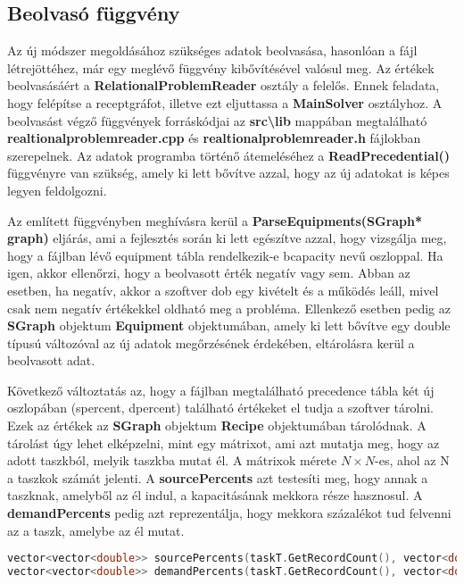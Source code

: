 \subsection{Beolvasó függvény}
Az új módszer megoldásához szükséges adatok beolvasása, hasonlóan a fájl létrejöttéhez, már egy meglévő függvény kibővítésével valósul meg.
Az értékek beolvasásáért a \textbf{RelationalProblemReader} osztály a felelős.
Ennek feladata, hogy felépítse a receptgráfot, illetve ezt eljuttassa a \textbf{MainSolver} osztályhoz.
A beolvasást végző függvények forráskódjai az \textbf{src\textbackslash lib} mappában megtalálható \textbf{realtionalproblemreader.cpp} és \textbf{realtionalproblemreader.h} fájlokban szerepelnek.
Az adatok programba történő átemeléséhez a \textbf{ReadPrecedential()} függvényre van szükség, amely ki lett bővítve azzal, hogy az új adatokat is képes legyen feldolgozni. 

Az említett függvényben meghívásra kerül a \textbf{ParseEquipments(SGraph* graph)} eljárás, ami a fejlesztés során ki lett egészítve azzal, hogy vizsgálja meg, hogy a fájlban lévő equipment tábla rendelkezik-e b\textunderscore capacity nevű oszloppal.
Ha igen, akkor ellenőrzi, hogy a beolvasott érték negatív vagy sem.
Abban az esetben, ha negatív, akkor a szoftver dob egy kivételt és a működés leáll, mivel csak nem negatív értékekkel oldható meg a probléma.
Ellenkező esetben pedig az \textbf{SGraph} objektum \textbf{Equipment} objektumában, amely ki lett bővítve egy double típusú változóval az új adatok megőrzésének érdekében, eltárolásra kerül a beolvasott adat.

Következő változtatás az, hogy a fájlban megtalálható precedence tábla két új oszlopában (s\textunderscore percent, d\textunderscore percent) található értékeket el tudja a szoftver tárolni.
Ezek az értékek az \textbf{SGraph} objektum \textbf{Recipe} objektumában tárolódnak.
A tárolást úgy lehet elképzelni, mint egy mátrixot, ami azt mutatja meg, hogy az adott taszkból, melyik taszkba mutat él.
A mátrixok mérete $N\times N$-es, ahol az N a taszkok számát jelenti.
A \textbf{sourcePercents} azt testesíti meg, hogy annak a taszknak, amelyből az él indul, a kapacitásának mekkora része hasznosul.
A \textbf{demandPercents} pedig azt reprezentálja, hogy mekkora százalékot tud felvenni az a taszk, amelybe az él mutat.
\begin{lstlisting}[caption={A sourcePercents és a demandPercents változók inicializálása},language=c++,numbers=none]
vector<vector<double>> sourcePercents(taskT.GetRecordCount(), vector<double>(taskT.GetRecordCount(), -1));
vector<vector<double>> demandPercents(taskT.GetRecordCount(), vector<double>(taskT.GetRecordCount(), -1));
\end{lstlisting}

